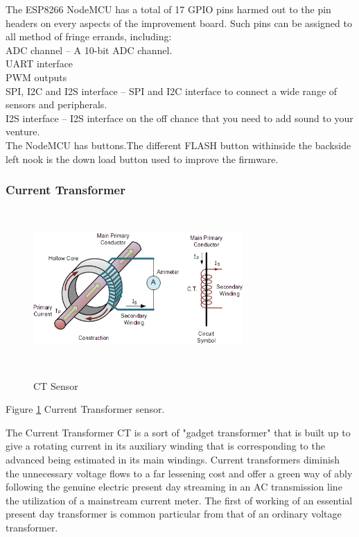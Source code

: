 \documentclass[12pt,a4paper]{article}
\begin{document}
\hspace{0.5cm} The ESP8266 NodeMCU has a total of 17 GPIO pins harmed out to the pin headers on every aspects of the improvement board. Such pins can be assigned to all method of fringe errands, including: \\
ADC channel – A 10-bit ADC channel.\\
UART interface \\
PWM outputs \\
SPI, I2C and I2S interface – SPI and I2C interface to connect a wide range of sensors and peripherals. \\

I2S interface – I2S interface on the off chance that you need to add sound to your venture.\\

\hspace{0.5cm}The NodeMCU has buttons.The different FLASH button withinside the backside left nook is the down load button used to improve the firmware.\\

\subsubsection{Current Transformer}

\begin{figure}[H]
	\centering
	\includegraphics[width=8cm, height=6cm]{ctsensor.png}\\
	\caption{CT Sensor}
	\label{fig:4.3.3}
\end{figure}
\begin{center}
Figure \ref{fig:4.3.3} Current Transformer sensor.
\end{center}

\hspace{0.5cm}The Current Transformer CT is a sort of "gadget transformer" that is built up 
to give a rotating current in its auxiliary winding that is corresponding to the advanced 
being estimated in its main windings. Current transformers diminish the unnecessary voltage flows 
to a far lessening cost and offer a green way of ably following the genuine electric present day streaming in an AC transmission line the utilization of a mainstream current meter. The first of working 
of an essential present day transformer is common particular from that of an ordinary voltage transformer.\\ 
\end{document}
